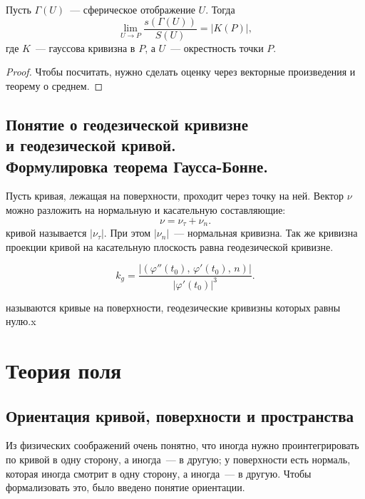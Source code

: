 \documentclass{notes}
\begin{document}
	\begin{thm}
		Пусть $\Gamma(U)$~--- сферическое отображение $U$. Тогда
		\[
			\lim_{U \to P} \dfrac{s(\Gamma(U))}{S(U)} = |K(P)|,
		\]
		где $K$~--- гауссова кривизна в $P$, а $U$~--- окрестность точки $P$.
		\begin{proof}
			Чтобы посчитать, нужно сделать оценку через векторные произведения и теорему о среднем.
		\end{proof}
	\end{thm}

\section{Понятие о геодезической кривизне \\ и геодезической кривой. \\ Формулировка теорема Гаусса-Бонне.}

	\begin{de}
		Пусть кривая, лежащая на поверхности, проходит через точку на ней. Вектор $\nu$ можно разложить на нормальную и касательную составляющие:
		\[
			\nu = \nu_{\tau} + \nu_n.
		\]
		 кривой называется $|\nu_{\tau}|$.
 		При этом $|\nu_n|$~--- нормальная кривизна.
 		Так же кривизна проекции кривой на касательную плоскость равна геодезической кривизне.
	\end{de}

	\begin{st}
		\[
			k_g = \dfrac{|(\varphi''(t_0), \, \varphi'(t_0), \, n)|}{|\varphi'(t_0)|^3}.
		\]
	\end{st}

	\begin{de}
		 называются кривые на поверхности, геодезические кривизны которых равны нулю.x
	\end{de}

\chapter{Теория поля}

\section{Ориентация кривой, поверхности и пространства}

	Из физических соображений очень понятно, что иногда нужно проинтегрировать по кривой в одну сторону, а иногда~--- в другую; у поверхности есть нормаль, которая иногда смотрит в одну сторону, а иногда~--- в другую. Чтобы формализовать это, было введено понятие ориентации.
\end{document}
